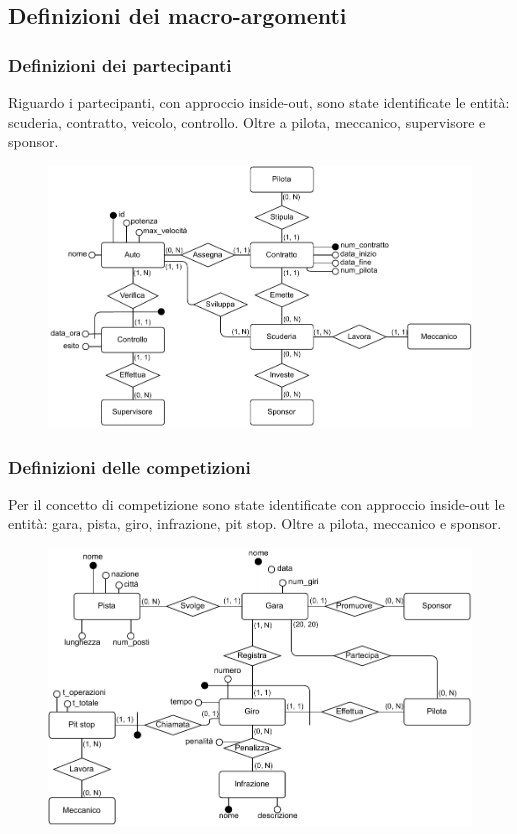 \documentclass[11pt]{article}
\begin{document}
\subsection{Definizioni dei macro-argomenti}
\subsubsection{Definizioni dei partecipanti}
Riguardo i partecipanti, con approccio inside-out, sono state identificate le entità: scuderia, contratto, veicolo, controllo. Oltre a pilota, meccanico, supervisore e sponsor.
\begin{figure}[H]
    \centering
    \includegraphics[width=15.5cm]{../er/gare_scuderie.pdf}
\end{figure}

\subsubsection{Definizioni delle competizioni}
Per il concetto di competizione sono state identificate con approccio inside-out le entità: gara, pista, giro, infrazione, pit stop. Oltre a pilota, meccanico e sponsor.
\begin{figure}[H]
    \centering
    \includegraphics[width=15.5cm]{../er/gare_gara.pdf}
\end{figure}
\end{document}
